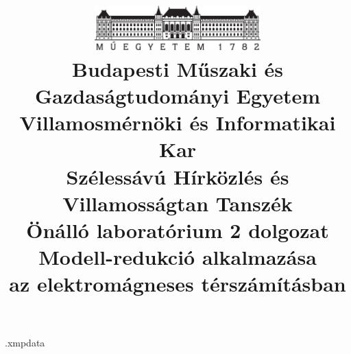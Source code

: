 \begin{filecontents*}[overwrite]{\jobname.xmpdata}
\end{filecontents*}

\documentclass[a4paper,12pt,titlepage]{article}
\usepackage{ucs}
\usepackage[T1]{fontenc}
\usepackage[utf8]{inputenc}
\usepackage[magyar]{babel}
\usepackage{amsfonts}
\usepackage{amsmath,bm}
\usepackage{amssymb}
\usepackage{graphicx}
\usepackage{subcaption}
\usepackage{blkarray,booktabs,bigstrut} %
\usepackage[left=25mm,right=25mm,top=25mm,bottom=25mm]{geometry}
\usepackage{hyperref}
\usepackage{listings}
\usepackage{siunitx}
\usepackage{xcolor}
\usepackage[a-3u]{pdfx}


\DeclareMathOperator{\rot}{rot}
\DeclareMathOperator{\divergence}{div}

\sloppy %
\def\hyph{-\penalty0\hskip0pt\relax} %

\frenchspacing
\pagestyle{plain} 


\title{
    \centering
    \includegraphics[width=0.48\textwidth]{kep/bme_logo.pdf} \\
    \vspace{0.5cm}
    \large{\bf Budapesti Műszaki és Gazdaságtudományi Egyetem \\
    Villamosmérnöki és Informatikai Kar \\
    Szélessávú Hírközlés és Villamosságtan Tanszék}\\
    \vspace{4cm}
    \large{Önálló laboratórium 2 dolgozat} \\
    \vspace{2cm}
    \Large{\bf{Modell-redukció alkalmazása\\ az elektromágneses térszámításban}} \\
    \vspace{2cm}
}

